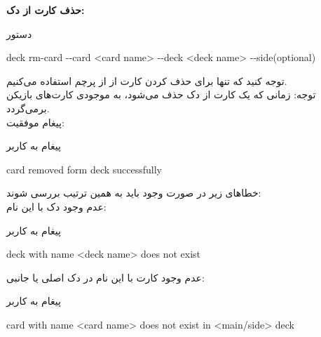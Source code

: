 \documentclass[]{article}
\begin{document}
\vspace{.5cm}
\textbf{حذف کارت از دک:}
\begin{mybox}[colback=yellow]{دستور}
	\begin{latin}	
		deck rm-card -{}-card <card name> -{}-deck <deck name> 
		-{}-side(optional)
	\end{latin}
\end{mybox}
توجه کنید که تنها برای حذف کردن کارت از  از پرچم  استفاده 
می‌کنیم.
\\
توجه: زمانی که یک کارت از دک حذف می‌شود، به موجودی کارت‌های بازیکن برمی‌گردد.
\\
پیغام موفقیت:
\begin{mybox}[colback=yellow]{پیغام به کاربر}
	\begin{latin}	
		card removed form deck successfully
	\end{latin}
\end{mybox}
خطاهای زیر در صورت وجود باید به همین ترتیب بررسی شوند:
\\
عدم وجود دک با این نام:
\begin{mybox}[colback=yellow]{پیغام به کاربر}
	\begin{latin}	
		deck with name <deck name> does not exist
	\end{latin}
\end{mybox}
عدم وجود کارت با این نام در دک اصلی یا جانبی:
\begin{mybox}[colback=yellow]{پیغام به کاربر}
	\begin{latin}	
		card with name <card name> does not exist in <main/side> deck
	\end{latin}
\end{mybox}
\end{document}
